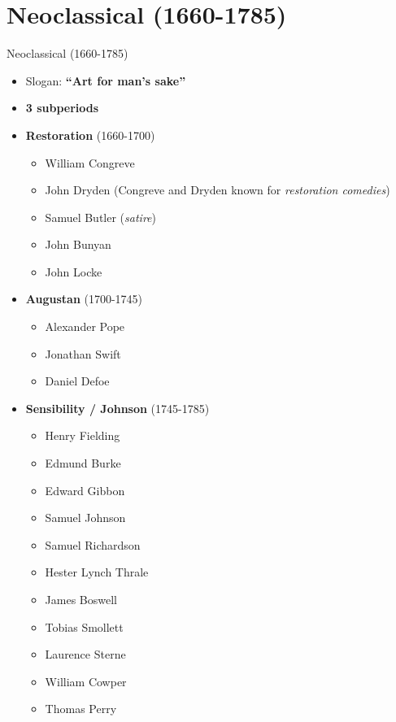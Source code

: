 \documentclass[
  12pt,
    progressbar=frametitle]{beamer}
\providecommand{\tightlist}{%
  \setlength{\itemsep}{0pt}\setlength{\parskip}{0pt}}
\begin{document}
\section{Neoclassical (1660-1785)}
\begin{frame}[allowframebreaks]
{Neoclassical (1660-1785)}
\begin{itemize}
\tightlist
\item
  Slogan: \textbf{``Art for man's sake''}
\item
  \textbf{3 subperiods}
\item
  \textbf{Restoration} (1660-1700)

  \begin{itemize}
  \tightlist
  \item
    William Congreve
  \item
    John Dryden (Congreve and Dryden known for \emph{restoration
    comedies})
  \item
    Samuel Butler (\emph{satire})
  \item
    John Bunyan
  \item
    John Locke
  \end{itemize}
\item
  \textbf{Augustan} (1700-1745)

  \begin{itemize}
  \tightlist
  \item
    Alexander Pope
  \item
    Jonathan Swift
  \item
    Daniel Defoe
  \end{itemize}
\item
  \textbf{Sensibility / Johnson} (1745-1785)

  \begin{itemize}
  \tightlist
  \item
    Henry Fielding
  \item
    Edmund Burke
  \item
    Edward Gibbon
  \item
    Samuel Johnson
  \item
    Samuel Richardson
  \item
    Hester Lynch Thrale
  \item
    James Boswell
  \item
    Tobias Smollett
  \item
    Laurence Sterne
  \item
    William Cowper
  \item
    Thomas Perry
  \end{itemize}
\end{itemize}
\end{frame}
\end{document}
